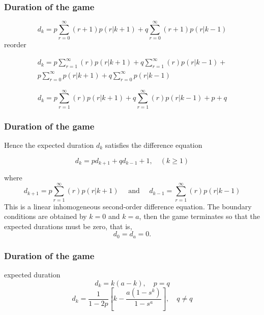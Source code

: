 \documentclass[spanish]{beamer}
\begin{document}
\begin{frame}
\frametitle{Duration of the game}

\begin{equation*}
d_{k} = p \sum_{r=0}^{\infty} (r+1)p(r \vert k+1)+ q \sum_{r=0}^{\infty}(r+1)p(r\vert k -1)
\end{equation*}
reorder 

\begin{multline*}
d_{k} = p \sum_{r=1}^{\infty} (r)p(r \vert k+1)+ q \sum_{r=1}^{\infty}(r)p(r\vert k -1)+ \\
p \sum_{r=0}^{\infty} p(r \vert k+1)+ q \sum_{r=0}^{\infty}p(r\vert k -1)
\end{multline*}

 
\begin{equation*}
d_{k} = p \sum_{r=1}^{\infty} (r)p(r \vert k+1)+ q \sum_{r=1}^{\infty}(r)p(r\vert k -1)+p+q
\end{equation*}
\end{frame}
\begin{frame}
\frametitle{Duration of the game}
Hence the expected duration $d_{k}$ satisfies the difference equation

\begin{equation*}
d_{k} = p d_{k+1} + q d_{k-1} + 1, \quad (k \geq 1)
\end{equation*}

where
\begin{equation*}
d_{k+1} = p \sum_{r=1}^{\infty} (r)p(r \vert k+1) \quad \text{  and  } \quad d_{k-1}=\sum_{r=1}^{\infty}(r)p(r\vert k -1)
\end{equation*}
This is a linear inhomogeneous second-order difference equation. The boundary conditions are obtained by $k = 0$ and $k = a$, then the game terminates so that the expected durations must be zero, that is, 
\begin{equation*}
d_{0} = d_{a} = 0.
\end{equation*}


\end{frame}

\begin{frame}
\frametitle{Duration of the game}
\begin{block}{expected duration}
\begin{equation*}
d_{k} = k(a - k), \quad p = q
\end{equation*}
\begin{equation*}
d_{k} = \frac{1}{1-2p} \left[  k-\frac{a(1-s^k)}{1-s^a} \right] , \quad q \neq q
\end{equation*}


\end{block}

\end{frame}
\end{document}

